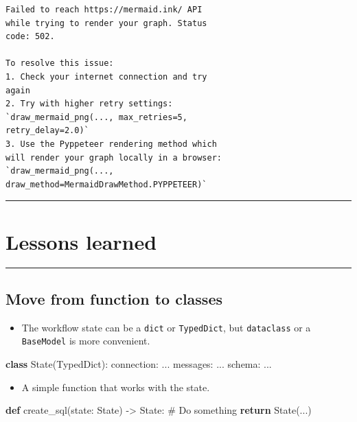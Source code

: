 \documentclass[
  letterpaper,
  DIV=11,
  numbers=noendperiod]{scrartcl}
\newenvironment{Shaded}{\begin{snugshade}}{\end{snugshade}}
\newcommand{\CommentTok}[1]{\textcolor[rgb]{0.37,0.37,0.37}{#1}}
\newcommand{\ControlFlowTok}[1]{\textcolor[rgb]{0.00,0.23,0.31}{\textbf{#1}}}
\newcommand{\KeywordTok}[1]{\textcolor[rgb]{0.00,0.23,0.31}{\textbf{#1}}}
\newcommand{\NormalTok}[1]{\textcolor[rgb]{0.00,0.23,0.31}{#1}}
\newcommand{\OperatorTok}[1]{\textcolor[rgb]{0.37,0.37,0.37}{#1}}
\providecommand{\tightlist}{%
  \setlength{\itemsep}{0pt}\setlength{\parskip}{0pt}}
\begin{document}
\begin{verbatim}
Failed to reach https://mermaid.ink/ API 
while trying to render your graph. Status 
code: 502.

To resolve this issue:
1. Check your internet connection and try 
again
2. Try with higher retry settings: 
`draw_mermaid_png(..., max_retries=5, 
retry_delay=2.0)`
3. Use the Pyppeteer rendering method which 
will render your graph locally in a browser: 
`draw_mermaid_png(..., 
draw_method=MermaidDrawMethod.PYPPETEER)`
\end{verbatim}

\begin{center}\rule{0.5\linewidth}{0.5pt}\end{center}

\section{Lessons learned}\label{lessons-learned}

\begin{center}\rule{0.5\linewidth}{0.5pt}\end{center}

\subsection{Move from function to
classes}\label{move-from-function-to-classes}

\begin{itemize}
\tightlist
\item
  The workflow state can be a \texttt{dict} or \texttt{TypedDict}, but
  \texttt{dataclass} or a \texttt{BaseModel} is more convenient.
\end{itemize}

\begin{Shaded}
\begin{Highlighting}[]
\KeywordTok{class}\NormalTok{ State(TypedDict):}
\NormalTok{  connection: ...}
\NormalTok{  messages: ...}
\NormalTok{  schema: ...}
\end{Highlighting}
\end{Shaded}

\begin{itemize}
\tightlist
\item
  A simple function that works with the state.
\end{itemize}

\begin{Shaded}
\begin{Highlighting}[]
\KeywordTok{def}\NormalTok{ create\_sql(state: State) }\OperatorTok{{-}\textgreater{}}\NormalTok{ State:}
  \CommentTok{\# Do something}
  \ControlFlowTok{return}\NormalTok{ State(...)}
\end{Highlighting}
\end{Shaded}
\end{document}
